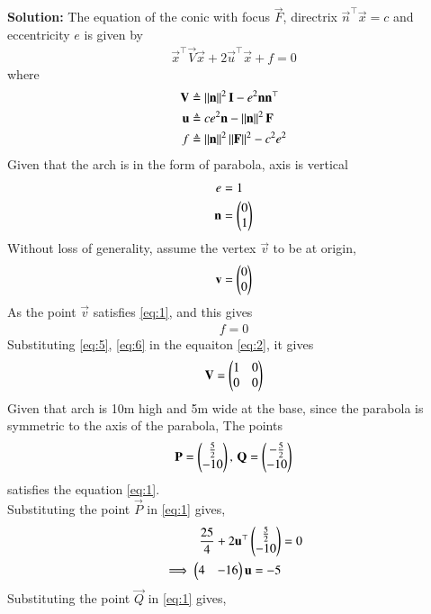 \documentclass[journal,12pt,twocolumn]{IEEEtran}
\begin{document}
\begin{enumerate}
\textbf{Solution:} The equation of the conic with focus $\vec{F}$, directrix $\vec{n}^\top\vec{x} = c$ and eccentricity $e$ is given by
\begin{align}
\vec{x}^\top\vec{V}\vec{x} + 2\vec{u}^\top\vec{x} + f = 0
\label{eq:1}
\end{align}
where
\begin{align}
\mathbf{V} &\triangleq \left\lVert\mathbf{n}\right\rVert^2\mathbf{I} - e^2\mathbf{n}\mathbf{n}^\top \label{eq:2} \\
\mathbf{u} &\triangleq ce^2\mathbf{n} - \left\lVert\mathbf{n}\right\rVert^2\mathbf{F} \label{eq:3} \\
f &\triangleq \left\lVert\mathbf{n}\right\rVert^2\left\lVert\mathbf{F}\right\rVert^2 - c^2e^2 \label{eq:4}
\end{align}
Given that the arch is in the form of parabola, axis is vertical 
\begin{align}
e &= 1 \label{eq:5} \\
\mathbf{n} &= \begin{pmatrix}0\\1\end{pmatrix} \label{eq:6}
\end{align}
Without loss of generality, assume the vertex $\vec{v}$ to be at origin,
\begin{align}
\mathbf{v} = \begin{pmatrix}0\\0\end{pmatrix}
\end{align}
As the point $\vec{v}$ satisfies \eqref{eq:1}, and this gives
\begin{align}
f = 0
\end{align}
Substituting \eqref{eq:5}, \eqref{eq:6} in the equaiton \eqref{eq:2}, it gives
\begin{align}
\mathbf{V} = \begin{pmatrix}1&0\\0&0\end{pmatrix}
\end{align}
Given that arch is 10m high and 5m wide at the base, since the parabola is symmetric to the axis of the parabola, The points
\begin{align}
\mathbf{P} = \begin{pmatrix}\frac{5}{2}\\ -10\end{pmatrix}, \, \mathbf{Q} = \begin{pmatrix}-	\frac{5}{2}\\ -10\end{pmatrix}
\end{align}
satisfies the equation \eqref{eq:1}. \\
Substituting the point $\vec{P}$ in \eqref{eq:1} gives,
\begin{align}
\frac{25}{4} + 2\mathbf{u}^\top \begin{pmatrix}\frac{5}{2}\\ -10\end{pmatrix} &= 0\\
\implies \begin{pmatrix}4&-16\end{pmatrix}\mathbf{u} = -5\label{eq:7}
\end{align}
Substituting the point $\vec{Q}$ in \eqref{eq:1} gives,
\begin{align}

\end{align}
\end{enumerate}
\end{document}
